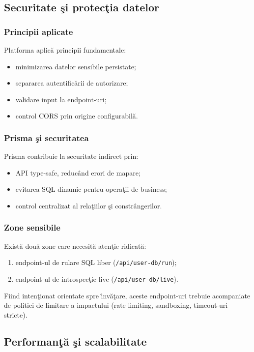 \documentclass[12pt,onecolumn,draftclsnofoot]{IEEEtran}
\begin{document}
\subsection{Securitate \c{s}i protec\c{t}ia datelor}
\subsubsection{Principii aplicate}
Platforma aplic\u{a} principii fundamentale:
\begin{itemize}
  \item minimizarea datelor sensibile persistate;
  \item separarea autentific\u{a}rii de autorizare;
  \item validare input la endpoint-uri;
  \item control CORS prin origine configurabil\u{a}.
\end{itemize}

\subsubsection{Prisma \c{s}i securitatea}
Prisma contribuie la securitate indirect prin:
\begin{itemize}
  \item API type-safe, reduc\^{a}nd erori de mapare;
  \item evitarea SQL dinamic pentru opera\c{t}ii de business;
  \item control centralizat al rela\c{t}iilor \c{s}i constr\^{a}ngerilor.
\end{itemize}

\subsubsection{Zone sensibile}
Exist\u{a} dou\u{a} zone care necesit\u{a} aten\c{t}ie ridicat\u{a}:
\begin{enumerate}[label=\alph*)]
  \item endpoint-ul de rulare SQL liber (\texttt{/api/user-db/run});
  \item endpoint-ul de introspec\c{t}ie live (\texttt{/api/user-db/live}).
\end{enumerate}
Fiind inten\c{t}ionat orientate spre \^{\i}nv\u{a}\c{t}are, aceste endpoint-uri trebuie acompaniate de politici de limitare a impactului (rate limiting, sandboxing, timeout-uri stricte).

\subsection{Performan\c{t}\u{a} \c{s}i scalabilitate}
\end{document}
